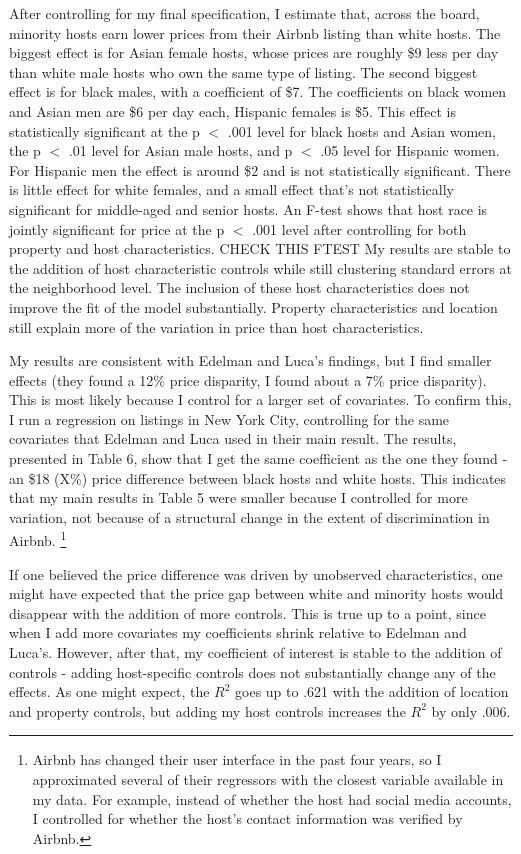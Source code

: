 After controlling for my final specification, I estimate that, across the board, minority hosts earn lower prices from their Airbnb listing than white hosts. The biggest effect is for Asian female hosts, whose prices are roughly \$9 less per day than white male hosts who own the same type of listing. The second biggest effect is for black males, with a coefficient of \$7. The coefficients on black women and Asian men are \$6 per day each, Hispanic females is \$5. This effect is statistically significant at the p $<$ .001 level for black hosts and Asian women, the p $<$ .01 level for Asian male hosts, and p $<$ .05 level for Hispanic women. For Hispanic men the effect is around \$2 and is not statistically significant. There is little effect for white females, and a small effect that's not statistically significant for middle-aged and senior hosts. An F-test shows that host race is jointly significant for price at the p $<$ .001 level after controlling for both property and host characteristics. CHECK THIS FTEST My results are stable to the addition of host characteristic controls while still clustering standard errors at the neighborhood level. The inclusion of these host characteristics does not improve the fit of the model substantially. Property characteristics and location still explain more of the variation in price than host characteristics. 

My results are consistent with Edelman and Luca's findings, but I find smaller effects (they found a 12\% price disparity, I found about a 7\% price disparity). This is most likely because I control for a larger set of covariates. To confirm this, I run a regression on listings in New York City, controlling for the same covariates that Edelman and Luca used in their main result. The results, presented in Table 6, show that I get the same coefficient as the one they found - an \$18 (X\%) price difference between black hosts and white hosts. This indicates that my main results in Table 5 were smaller because I controlled for more variation, not because of a structural change in the extent of discrimination in Airbnb.%
	\footnote{Airbnb has changed their user interface in the past four years, so I approximated several of their regressors with the closest variable available in my data. For example, instead of whether the host had social media accounts, I controlled for whether the host's contact information was verified by Airbnb.}

If one believed the price difference was driven by unobserved characteristics, one might have expected that the price gap between white and minority hosts would disappear with the addition of more controls. This is true up to a point, since when I add more covariates my coefficients shrink relative to Edelman and Luca's. However, after that, my coefficient of interest is stable to the addition of controls - adding host-specific controls does not substantially change any of the effects. As one might expect, the $R^2$ goes up to .621 with the addition of location and property controls, but adding my host controls increases the $R^2$ by only .006. 

